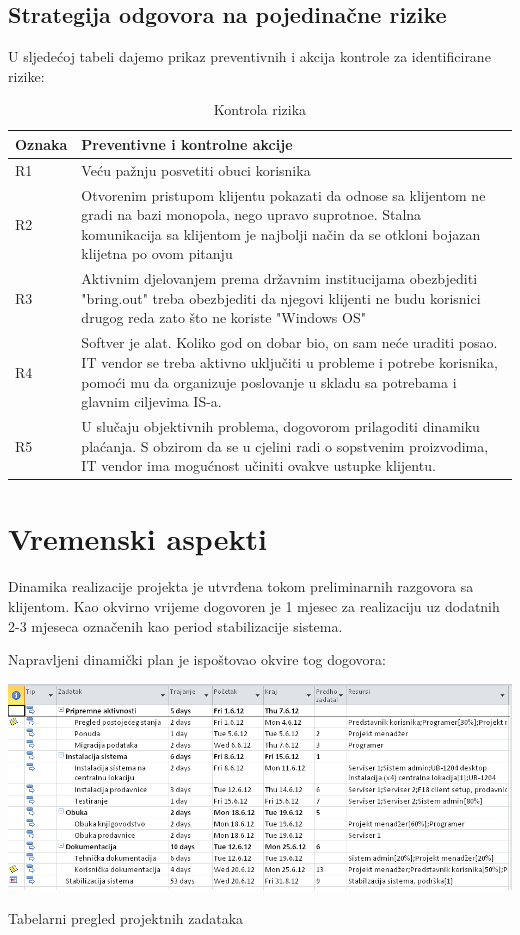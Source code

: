 \documentclass[times, utf8, seminar]{fit}
\begin{document}
\subsection{Strategija odgovora na pojedinačne rizike} 

U sljedećoj tabeli dajemo prikaz preventivnih i akcija kontrole za identificirane rizike:

\begin{table}[!h]
\centering
\begin{tabular}{|p{1.7cm}|p{13.2cm}|}
\hline
Oznaka & Preventivne i kontrolne akcije  \\ \hline\hline
R1 & Veću pažnju posvetiti obuci korisnika \\ \hline
R2 & Otvorenim pristupom klijentu pokazati da odnose sa klijentom ne gradi na bazi monopola, nego upravo suprotnoe. Stalna komunikacija sa klijentom je najbolji način da se otkloni bojazan klijetna po ovom pitanju\\ \hline
R3 & Aktivnim djelovanjem prema državnim institucijama obezbjediti "bring.out" treba obezbjediti da njegovi klijenti ne budu korisnici drugog reda zato što ne koriste "Windows OS"\\ \hline 
R4 & Softver je alat. Koliko god on dobar bio, on sam neće uraditi posao. IT vendor se treba aktivno uključiti u probleme i potrebe korisnika, pomoći mu da organizuje poslovanje u skladu sa potrebama i glavnim ciljevima IS-a.\\ \hline
R5 & U slučaju objektivnih problema, dogovorom prilagoditi dinamiku plaćanja. S obzirom da se u cjelini radi o sopstvenim proizvodima, IT vendor ima mogućnost učiniti ovakve ustupke klijentu. \\ \hline
\end{tabular}
\caption{Kontrola rizika}
\end{table}

\pagebreak
\section{Vremenski aspekti}

Dinamika realizacije projekta je utvrđena tokom preliminarnih razgovora sa klijentom. Kao okvirno vrijeme dogovoren je 1 mjesec za realizaciju uz dodatnih 2-3 mjeseca označenih kao period stabilizacije sistema. 

Napravljeni dinamički plan je ispoštovao okvire tog dogovora:

\begin{table}[!h]
\centering
\includegraphics[width=15.5cm]{img/dinamika_sheet.png}
\caption{Tabelarni pregled projektnih zadataka}
\end{table}
\end{document}
